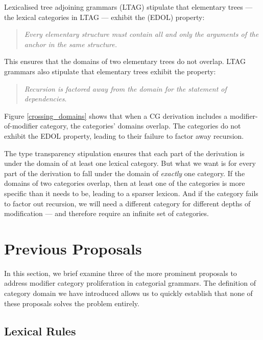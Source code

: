 \documentclass{article}
\newcommand{\cg}{CG\xspace}
\begin{document}
Lexicalised tree adjoining grammars (LTAG) \citep{ltag} stipulate that elementary trees --- the lexical categories in LTAG --- exhibit the  (EDOL) property:

\begin{quote}
\emph{Every elementary structure must contain all and only the arguments of the anchor in the same structure.}
\end{quote}

This ensures that the domains of two elementary trees do not overlap. LTAG grammars also stipulate that elementary trees exhibit the  property:

\begin{quote}
\emph{Recursion is factored away from the domain for the statement of dependencies}.
\end{quote}

Figure \ref{crossing_domains} shows that when a \cg derivation includes a modifier-of-modifier category, the categories' domains overlap. The categories do not exhibit the EDOL property, leading to their failure to factor away recursion.

The type transparency stipulation ensures that each part of the derivation is under the domain of at least one lexical category. But what we want is for every part of the derivation to fall under the domain of \emph{exactly} one category. If the domains of two categories overlap, then at least one of the categories is more specific than it needs to be, leading to a sparser lexicon. And if the category fails to factor out recursion, we will need a different category for different depths of modification --- and therefore require an infinite set of categories.



\section{Previous Proposals}

In this section, we brief examine three of the more prominent proposals to address modifier category proliferation in categorial grammars. The definition of category domain we have introduced allows us to quickly establish that none of these proposals solves the problem entirely.

\subsection{Lexical Rules}
\end{document}
